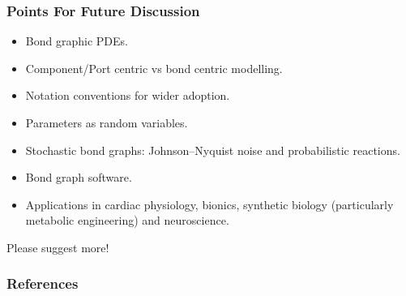 \documentclass[10pt,reqno]{beamer}
\begin{document}
\begin{frame}
\frametitle{Points For Future Discussion}
\begin{itemize}
	\item Bond graphic PDEs.
	\item Component/Port centric vs bond centric modelling.
	\item Notation conventions for wider adoption.
	\item Parameters as random variables.
	\item Stochastic bond graphs: Johnson–Nyquist noise and probabilistic reactions.
	\item Bond graph software.
	\item Applications in cardiac physiology, bionics, synthetic biology (particularly metabolic engineering) and neuroscience.
\end{itemize}
Please suggest more!
\end{frame}
\begin{frame}
\frametitle{References}
\printbibliography
\end{frame}
\end{document}

